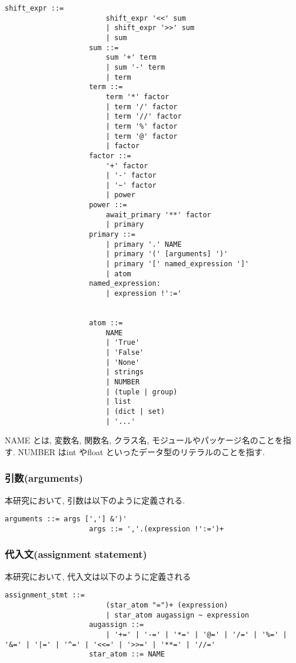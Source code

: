 \documentclass{jlreq}
\begin{document}
\begin{lstlisting}[caption=式の定義]
                    shift_expr ::=
                        shift_expr '<<' sum 
                        | shift_expr '>>' sum 
                        | sum
                    sum ::=
                        sum '+' term 
                        | sum '-' term 
                        | term
                    term ::=
                        term '*' factor 
                        | term '/' factor 
                        | term '//' factor 
                        | term '%' factor 
                        | term '@' factor 
                        | factor
                    factor ::=
                        '+' factor 
                        | '-' factor 
                        | '~' factor 
                        | power
                    power ::=
                        await_primary '**' factor 
                        | primary
                    primary ::=
                        | primary '.' NAME 
                        | primary '(' [arguments] ')' 
                        | primary '[' named_expression ']' 
                        | atom
                    named_expression:
                        | expression !':='


                    atom ::=
                        NAME
                        | 'True' 
                        | 'False' 
                        | 'None' 
                        | strings
                        | NUMBER
                        | (tuple | group)
                        | list
                        | (dict | set)
                        | '...'
                \end{lstlisting}
                NAME とは, 変数名, 関数名, クラス名, モジュールやパッケージ名のことを指す. NUMBER はint やfloat といったデータ型のリテラルのことを指す.
            \subsubsection{引数(arguments)}
                本研究において, 引数は以下のように定義される.
                \begin{lstlisting}[caption=代入文の定義,label=fuga]
                    arguments ::= args [','] &')'
                    args ::= ','.(expression !':=')+
                \end{lstlisting}
            \subsubsection{代入文(assignment statement)}
                本研究において, 代入文は以下のように定義される
                \begin{lstlisting}[caption=代入文の定義,label=fuga]
                    assignment_stmt ::=  
                        (star_atom "=")+ (expression)
                        | star_atom augassign ~ expression
                    augassign ::=
                        | '+=' | '-=' | '*=' | '@=' | '/=' | '%=' | '&=' | '|=' | '^=' | '<<=' | '>>=' | '**=' | '//='
                    star_atom ::= NAME
                \end{lstlisting}
\end{document}
